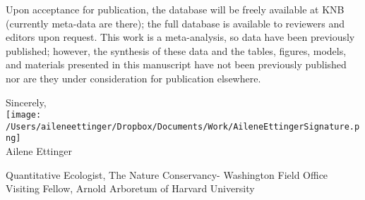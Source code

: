 \documentclass[11.5pt,a4paper]{letter}
\begin{document}
\begin{letter}{}
\par Upon acceptance for publication, the database will be freely available at KNB (currently meta-data are there); the full database is available to reviewers and editors upon request. This work is a meta-analysis, so data have been previously published; however, the synthesis of these data and the tables, figures, models, and materials presented in this manuscript have not been previously published nor are they under consideration for publication elsewhere.

Sincerely,\\

\texttt{[image: /Users/aileneettinger/Dropbox/Documents/Work/AileneEttingerSignature.png]} \\
Ailene Ettinger\\
\begin{footnotesize}
Quantitative Ecologist, The Nature Conservancy- Washington Field Office
Visiting Fellow, Arnold Arboretum of Harvard University 
\end{footnotesize}

\end{letter}
\end{document}
